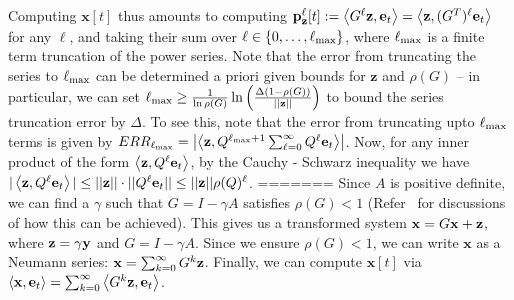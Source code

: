Computing $\mathbf{x}[t]$ thus amounts to computing ${\mathbf{p}}_\mathbf{z}^{\ell}[t] := \left< G^{\ell}\mathbf{z}, \mathbf{e}_t \right> = \left< \mathbf{z}, (G^T)^{\ell}\mathbf{e}_t \right>$ for any $\ell$, and taking their sum over $\ell \in \{0,\ldots,\ell_{\max}\}$, where $\ell_{\max}$ is a finite term truncation of the power series.
Note that the error from truncating the series to $\ell_{\max}$ can be determined a priori given bounds for $\mathbf{z}$ and $\rho(G)$ -- in particular, we can set $\ell_{\max} \geq \frac{1}{\ln \rho(G)} \ln \left(\frac{\Delta(1 - \rho(G))}{||\mathbf{z}||} \right)$  to bound the series truncation error by $\Delta$. 
To see this, note that the error from truncating upto $\ell_{\max}$ terms is given by $ERR_{\ell_{\max}} = \left| \left< \mathbf{z},  Q^{\ell_{\max} + 1} \sum_{\ell= 0}^\infty Q^\ell\mathbf{e}_t \right> \right|$. Now, for any inner product of the form $\left< \mathbf{z}, Q^\ell \mathbf{e}_t \right>$, by the Cauchy - Schwarz inequality we have $|\left< \mathbf{z}, Q^\ell \mathbf{e}_t \right>| \leq ||\mathbf{z}|| \cdot ||{Q}^\ell \mathbf{e}_t|| \leq ||\mathbf{z}|| \rho(Q)^{\ell}$.
=======
Since $A$ is positive definite, we can find a $\gamma$ such that $G = I - \gamma A$ satisfies $\rho(G) < 1$ (Refer~\cite{dimov2015new,lee2014asynchronous} for discussions of how this can be achieved). 
This gives us a transformed system $\mathbf{x} = G\mathbf{x} + \mathbf{z}$, where $\mathbf{z} = \gamma \mathbf{y}$ and $G = I - \gamma A$. 
Since we ensure $\rho(G)<1$, we can write $\mathbf{x}$ as a Neumann series: $\mathbf{x} = \sum_{k=0}^\infty G^k \mathbf{z}$.
Finally, we can compute $\mathbf{x}[t]$ via $\left< \mathbf{x}, \mathbf{e}_t \right> = \sum_{k=0}^\infty \left< G^k \mathbf{z}, \mathbf{e}_t \right>$. 


